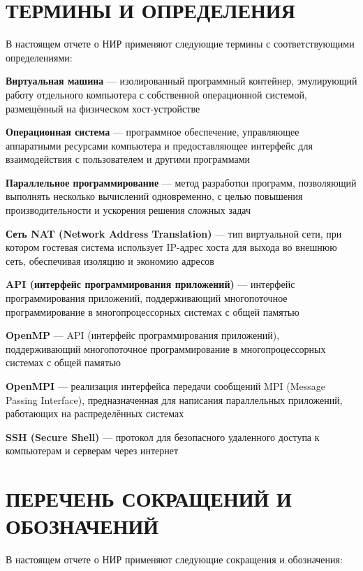 \documentclass[11pt,a4paper,final]{article}
\begin{document}
\newpage
\tableofcontents

\newpage
\section*{ТЕРМИНЫ И ОПРЕДЕЛЕНИЯ}

В настоящем отчете о НИР применяют следующие термины с соответствующими определениями:

\textbf{Виртуальная машина} — изолированный программный контейнер, эмулирующий работу отдельного компьютера с собственной операционной системой, размещённый на физическом хост-устройстве

\textbf{Операционная система} — программное обеспечение, управляющее аппаратными ресурсами компьютера и предоставляющее интерфейс для взаимодействия с пользователем и другими программами

\textbf{Параллельное программирование} — метод разработки программ, позволяющий выполнять несколько вычислений одновременно, с целью повышения производительности и ускорения решения сложных задач

\textbf{Сеть NAT (Network Address Translation)} — тип виртуальной сети, при котором гостевая система использует IP-адрес хоста для выхода во внешнюю сеть, обеспечивая изоляцию и экономию адресов

\textbf{API (интерфейс программирования приложений)} — интерфейс программирования приложений, поддерживающий многопоточное программирование в многопроцессорных системах с общей памятью

\textbf{OpenMP} — API (интерфейс программирования приложений), поддерживающий многопоточное программирование в многопроцессорных системах с общей памятью

\textbf{OpenMPI} — реализация интерфейса передачи сообщений MPI (Message Passing Interface), предназначенная для написания параллельных приложений, работающих на распределённых системах

\textbf{SSH (Secure Shell)} — протокол для безопасного удаленного доступа к компьютерам и серверам через интернет


\newpage
\section*{ПЕРЕЧЕНЬ СОКРАЩЕНИЙ И ОБОЗНАЧЕНИЙ}

В настоящем отчете о НИР применяют следующие сокращения и обозначения:
\end{document}
